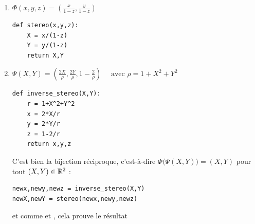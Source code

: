   
  
\begin{frame}[fragile]
\begin{enumerate}
  \item  
  
  $\Phi(x,y,z) = \left( \frac{x}{1-z}, \frac{y}{1-z} \right)$
  
  
\begin{algo}
\begin{lstlisting}  
def stereo(x,y,z):  
    X = x/(1-z)
    Y = y/(1-z)
    return X,Y
\end{lstlisting}
\end{algo}   


\end{enumerate}

\end{frame}


\begin{frame}[fragile]
\begin{enumerate}
\setcounter{enumi}{1} 
  \item 
  
  $\Psi (X,Y) = \left( \frac{2X}{\rho},\frac{2Y}{\rho},1-\frac{2}{\rho}  \right) \quad \text{ avec } \rho = 1+X^2+Y^2$

\begin{algo}
\begin{lstlisting}  
def inverse_stereo(X,Y):
    r = 1+X^2+Y^2
    x = 2*X/r
    y = 2*Y/r
    z = 1-2/r
    return x,y,z
\end{lstlisting}
\end{algo}   

\pause
C'est bien la bijection réciproque, c'est-à-dire
  $\Phi\big( \Psi(X,Y) \big) = (X,Y)$ pour tout $(X,Y) \in \mathbb{R}^2$ :

\pause
\begin{algo}
\begin{lstlisting}  
newx,newy,newz = inverse_stereo(X,Y)
newX,newY = stereo(newx,newy,newz)
\end{lstlisting}
\end{algo} 

\pause
 et comme  et , cela prouve le résultat
 
\end{enumerate}
\end{frame}


